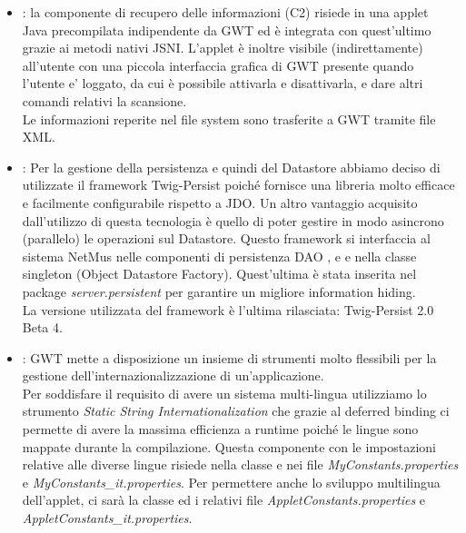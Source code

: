\begin{itemize}
  \item {} : la componente di recupero delle informazioni (C2) risiede
  in una applet \\Java precompilata indipendente da GWT ed \`e integrata con
  quest'ultimo grazie ai metodi nativi JSNI. L'applet \`e inoltre visibile
  (indirettamente) all'utente con una piccola interfaccia grafica di GWT
  presente quando l'utente e' loggato, da cui \`e possibile
  attivarla e disattivarla, e dare altri comandi relativi la scansione.\\ Le
  informazioni reperite nel file system sono trasferite a GWT tramite file XML.
  
  \item {} : Per la gestione della persistenza e quindi del
  Datastore abbiamo deciso di utilizzate il framework Twig-Persist poich\'e
  fornisce una libreria molto efficace e facilmente configurabile
  rispetto a JDO. Un altro vantaggio acquisito dall'utilizzo di questa
  tecnologia \`e quello di poter gestire in modo asincrono (parallelo) le
  operazioni sul Datastore. Questo framework si interfaccia al sistema NetMus
  nelle componenti di persistenza DAO ,  e
   e nella classe singleton  (Object Datastore
  Factory). Quest'ultima \`e stata inserita nel package \emph{server.persistent}
  per garantire un migliore information hiding. \\
  La versione utilizzata del framework \`e l'ultima rilasciata: Twig-Persist 2.0
  Beta 4.
  
  \item {} : GWT mette a disposizione un insieme di
  strumenti molto flessibili per la gestione dell'internazionalizzazione di
  un'applicazione.\\ Per soddisfare il requisito di avere un sistema
  multi-lingua utilizziamo lo strumento \emph{Static String
  Internationalization} che grazie al deferred binding ci permette di avere la
  massima efficienza a runtime poich\'e le lingue sono mappate durante la
  compilazione. Questa componente con le impostazioni relative alle
  diverse lingue risiede nella classe  e nei file
  \emph{MyConstants.properties} e \emph{MyConstants\_it.properties}. Per
  permettere anche lo sviluppo multilingua dell'applet, ci sar\`a la classe
   ed i relativi file \emph{AppletConstants.properties} e
  \emph{AppletConstants\_it.properties}.
\end{itemize}

